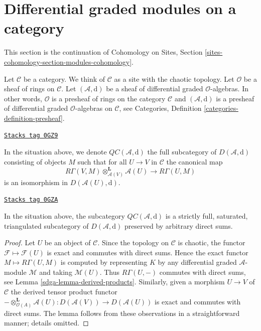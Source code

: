 \section{Differential graded modules on a category}
\label{sdga-section-modules-cohomology}
This section is the continuation of
Cohomology on Sites, Section \ref{sites-cohomology-section-modules-cohomology}.

\medskip\noindent
Let $\mathcal{C}$ be a category. We think of $\mathcal{C}$ as a site with
the chaotic topology. Let $\mathcal{O}$ be a sheaf of rings on $\mathcal{C}$.
Let $(\mathcal{A}, \text{d})$ be a sheaf of differential graded
$\mathcal{O}$-algebras. In other words, $\mathcal{O}$ is
a presheaf of rings on the category $\mathcal{C}$ and
$(\mathcal{A}, \text{d})$ is a presheaf of differential graded
$\mathcal{O}$-algebras on $\mathcal{C}$, see
Categories, Definition \ref{categories-definition-presheaf}.

\begin{definition}[Cartesian]
\label{sdga-definition-cartesian}
\href{https://stacks.math.columbia.edu/tag/0GZ9}{\texttt{Stacks tag 0GZ9}}

In the situation above, we denote
{\it $\mathit{QC}(\mathcal{A}, \text{d})$}
the full subcategory of $D(\mathcal{A}, \text{d})$
consisting of objects $M$ such that
for all $U \to V$ in $\mathcal{C}$ the canonical map
$$
R\Gamma(V, M) \otimes_{\mathcal{A}(V)}^\mathbf{L} \mathcal{A}(U)
\longrightarrow
R\Gamma(U, M)
$$
is an isomorphism in $D(\mathcal{A}(U), \text{d})$.
\end{definition}

\begin{lemma}
\label{sdga-lemma-cartesian-good-sub}
\href{https://stacks.math.columbia.edu/tag/0GZA}{\texttt{Stacks tag 0GZA}}

In the situation above, the subcategory $\mathit{QC}(\mathcal{A}, \text{d})$
is a strictly full, saturated, triangulated subcategory of
$D(\mathcal{A}, \text{d})$ preserved by arbitrary direct sums.
\end{lemma}

\begin{proof}

Let $U$ be an object of $\mathcal{C}$. Since the topology
on $\mathcal{C}$ is chaotic, the functor $\mathcal{F} \mapsto \mathcal{F}(U)$
is exact and commutes with direct sums. Hence the exact functor
$M \mapsto R\Gamma(U, M)$ is computed by representing $K$ by any
differential graded $\mathcal{A}$-module
$\mathcal{M}$ and taking $\mathcal{M}(U)$.
Thus $R\Gamma(U, -)$ commutes with direct sums, see
Lemma \ref{sdga-lemma-derived-products}.
Similarly, given a morphism $U \to V$ of $\mathcal{C}$
the derived tensor product functor
$- \otimes_{\mathcal{O}(A)}^\mathbf{L} \mathcal{A}(U) :
D(\mathcal{A}(V)) \to D(\mathcal{A}(U))$
is exact and commutes with direct sums. The lemma follows
from these observations in a straightforward manner; details omitted.
\end{proof}

